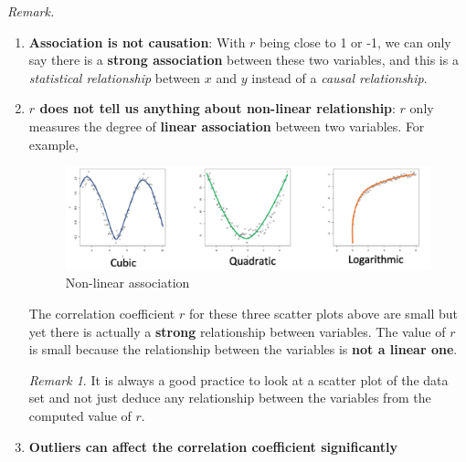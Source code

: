 \documentclass[math,code]{amznotes}
\theoremstyle{remark}
\newtheorem*{remark}{Remark}
\begin{document}
\begin{notebox}
    \textit{Remark.}
    \begin{enumerate}
        \item \textbf{Association is not causation}: With $r$ being close to 1 or -1, we can only say there is a \textbf{strong association} between these two variables, and this is a \textit{statistical relationship} between $x$ and $y$ instead of a \textit{causal relationship}.
        \item \textbf{$r$ does not tell us anything about non-linear relationship}: $r$ only measures the degree of \textbf{linear association} between two variables. For example,
        \begin{figure}[H]
            \centering
            \includegraphics[width=0.75\linewidth]{images/chapter3-r-and-non-linear-association.png}
            \caption{Non-linear association}
            \label{fig:chapter3-r-and-non-linear-association}
        \end{figure}
        The correlation coefficient $r$ for these three scatter plots above are small but yet there is actually a \textbf{strong} relationship between variables. The value of $r$ is small because the relationship between the variables is \textbf{not a linear one}.
        \begin{notebox}
            \begin{remark}
                It is always a good practice to look at a scatter plot of the data set and not just deduce any relationship between the variables from the computed value of $r$.
            \end{remark}
        \end{notebox}
        \item \textbf{Outliers can affect the correlation coefficient significantly}
    \end{enumerate}
\end{notebox}
\end{document}
